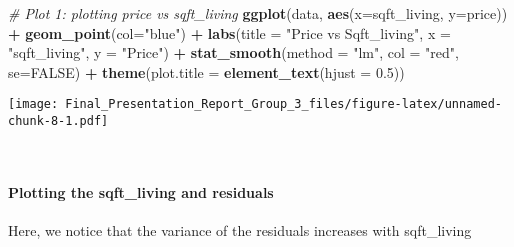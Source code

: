 \documentclass[
]{article}
\newenvironment{Shaded}{\begin{snugshade}}{\end{snugshade}}
\newcommand{\CommentTok}[1]{\textcolor[rgb]{0.56,0.35,0.01}{\textit{#1}}}
\newcommand{\DataTypeTok}[1]{\textcolor[rgb]{0.13,0.29,0.53}{#1}}
\newcommand{\FloatTok}[1]{\textcolor[rgb]{0.00,0.00,0.81}{#1}}
\newcommand{\KeywordTok}[1]{\textcolor[rgb]{0.13,0.29,0.53}{\textbf{#1}}}
\newcommand{\NormalTok}[1]{#1}
\newcommand{\OperatorTok}[1]{\textcolor[rgb]{0.81,0.36,0.00}{\textbf{#1}}}
\newcommand{\OtherTok}[1]{\textcolor[rgb]{0.56,0.35,0.01}{#1}}
\newcommand{\StringTok}[1]{\textcolor[rgb]{0.31,0.60,0.02}{#1}}
\begin{document}
\begin{Shaded}
\begin{Highlighting}[]
\CommentTok{# Plot 1: plotting price vs sqft_living}
\KeywordTok{ggplot}\NormalTok{(data, }\KeywordTok{aes}\NormalTok{(}\DataTypeTok{x=}\NormalTok{sqft_living, }\DataTypeTok{y=}\NormalTok{price)) }\OperatorTok{+}\StringTok{ }\KeywordTok{geom_point}\NormalTok{(}\DataTypeTok{col=}\StringTok{"blue"}\NormalTok{) }\OperatorTok{+}\StringTok{ }
\KeywordTok{labs}\NormalTok{(}\DataTypeTok{title =} \StringTok{"Price vs Sqft_living"}\NormalTok{, }\DataTypeTok{x =} \StringTok{"sqft_living"}\NormalTok{, }\DataTypeTok{y =} \StringTok{"Price"}\NormalTok{) }\OperatorTok{+}
\KeywordTok{stat_smooth}\NormalTok{(}\DataTypeTok{method =} \StringTok{"lm"}\NormalTok{, }\DataTypeTok{col =} \StringTok{"red"}\NormalTok{, }\DataTypeTok{se=}\OtherTok{FALSE}\NormalTok{) }\OperatorTok{+}\StringTok{ }\KeywordTok{theme}\NormalTok{(}\DataTypeTok{plot.title =} \KeywordTok{element_text}\NormalTok{(}\DataTypeTok{hjust =} \FloatTok{0.5}\NormalTok{))}
\end{Highlighting}
\end{Shaded}

\texttt{[image: Final\_Presentation\_Report\_Group\_3\_files/figure-latex/unnamed-chunk-8-1.pdf]}

~

\hypertarget{plotting-the-sqft_living-and-residuals}{%
\paragraph{Plotting the sqft\_living and
residuals}\label{plotting-the-sqft_living-and-residuals}}

Here, we notice that the variance of the residuals increases with
sqft\_living

\begin{Shaded}
\end{Shaded}
\end{document}
